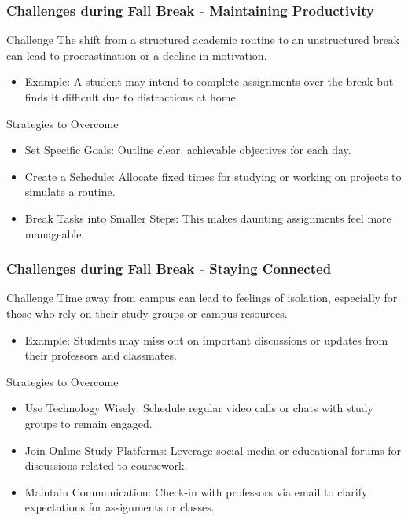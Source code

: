 \documentclass[aspectratio=169]{beamer}
\begin{document}
\begin{frame}[fragile]
    \frametitle{Challenges during Fall Break - Maintaining Productivity}
    \begin{block}{Challenge}
        The shift from a structured academic routine to an unstructured break can lead to procrastination or a decline in motivation.
        \begin{itemize}
            \item Example: A student may intend to complete assignments over the break but finds it difficult due to distractions at home.
        \end{itemize}
    \end{block}
    
    \begin{block}{Strategies to Overcome}
        \begin{itemize}
            \item Set Specific Goals: Outline clear, achievable objectives for each day.
            \item Create a Schedule: Allocate fixed times for studying or working on projects to simulate a routine.
            \item Break Tasks into Smaller Steps: This makes daunting assignments feel more manageable.
        \end{itemize}
    \end{block}
\end{frame}

\begin{frame}[fragile]
    \frametitle{Challenges during Fall Break - Staying Connected}
    \begin{block}{Challenge}
        Time away from campus can lead to feelings of isolation, especially for those who rely on their study groups or campus resources.
        \begin{itemize}
            \item Example: Students may miss out on important discussions or updates from their professors and classmates.
        \end{itemize}
    \end{block}
    
    \begin{block}{Strategies to Overcome}
        \begin{itemize}
            \item Use Technology Wisely: Schedule regular video calls or chats with study groups to remain engaged.
            \item Join Online Study Platforms: Leverage social media or educational forums for discussions related to coursework.
            \item Maintain Communication: Check-in with professors via email to clarify expectations for assignments or classes.
        \end{itemize}
    \end{block}
\end{frame}
\end{document}
